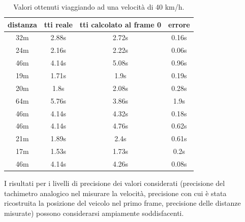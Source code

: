 \documentclass[12pt]{report}
\begin{document}
\begin{table}[H]
\centering
\begin{tabular}{|c|c|c|c|}
	\hline
	distanza & tti reale & \begin{minipage}{2.5cm}\centering tti calcolato al frame 0 \end{minipage}& errore\\[6pt] \hline
	32m	& 2.88s	& 2.72s	& 0.16s	\\ \hline
	24m	& 2.16s	& 2.22s	& 0.06s	\\ \hline
	46m	& 4.14s	& 5.08s	& 0.96s	\\ \hline
	19m	& 1.71s	& 1.9s	& 0.19s	\\ \hline
	20m	& 1.8s	& 2.08s	& 0.28s	\\ \hline
	64m	& 5.76s	& 3.86s	& 1.9s	\\ \hline
	46m	& 4.14s	& 4.32s	& 0.18s	\\ \hline
	46m	& 4.14s	& 4.76s	& 0.62s	\\ \hline
	21m	& 1.89s	& 2.4s	& 0.61s	\\ \hline
	17m	& 1.53s	& 1.73s	& 0.2s	\\ \hline
	46m	& 4.14s	& 4.26s	& 0.08s	\\ \hline
\end{tabular}
\caption{Valori ottenuti viaggiando ad una velocit\`a di 40 km/h.}
\end{table}

\noindent I risultati per i livelli di precisione dei valori considerati (precisione del tachimetro analogico nel misurare la velocit\`a, precisione con cui \`e stata ricostruita la posizione del veicolo nel primo frame, precisione delle distanze misurate) possono considerarsi ampiamente soddisfacenti.\\
\end{document}

